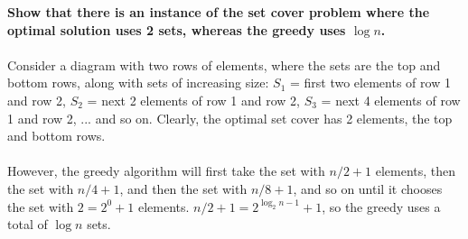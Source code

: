 \begin{problem}{5.33}
\textbf{Show that there is an instance of the set cover problem where the optimal solution uses 2 sets, whereas the greedy uses $\log n$.}
\\
\\
Consider a diagram with two rows of elements, where the sets are the top and bottom rows, along with sets of increasing size: $S_1$ = first two elements of row 1 and row 2, $S_2$ = next 2 elements of row 1 and row 2, $S_3$ = next 4 elements of row 1 and row 2, ... and so on. Clearly, the optimal set cover has 2 elements, the top and bottom rows. 
\\
\\
However, the greedy algorithm will first take the set with $n / 2 + 1$ elements, then the set with $n / 4 + 1$, and then the set with $n / 8 + 1$, and so on until it chooses the set with $2 = 2^0 + 1$ elements. $n / 2 + 1 = 2^{\log_2 n - 1} + 1$, so the greedy uses a total of $\log n$ sets.
\end{problem}

